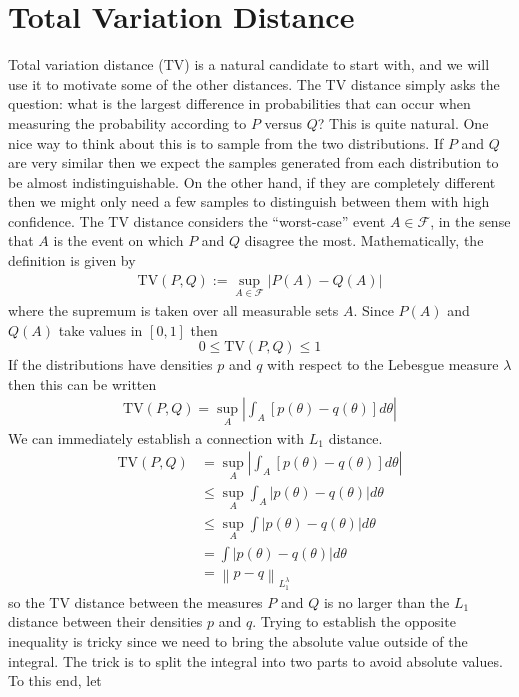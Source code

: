 \documentclass[12pt]{article}
\newcommand*{\norm}[1]{\left\lVert#1\right\rVert}
\newcommand*{\abs}[1]{\left\lvert#1\right\rvert}
\begin{document}
\section{Total Variation Distance}
Total variation distance (TV) is a natural candidate to start with, and we will use it to motivate some of the other distances. The TV distance simply asks the question: what is the largest difference in 
probabilities that can occur when measuring the probability according to $P$ versus $Q$? This is quite natural. One nice way to think about this is to sample from the 
two distributions. If $P$ and $Q$ are very similar then we expect the samples generated from each distribution to be almost indistinguishable. On the other hand, if they are completely 
different then we might only need a few samples to distinguish between them with high confidence. The TV distance considers the ``worst-case'' event $A \in \mathcal{F}$, in the sense that $A$ is the event 
on which $P$ and $Q$ disagree the most. Mathematically, the definition is given by 
\begin{align*}
\text{TV}(P, Q) := \sup_{A \in \mathcal{F}} \abs{P(A) - Q(A)}
\end{align*}
where the supremum is taken over all measurable sets $A$. Since $P(A)$ and $Q(A)$ take values in $[0, 1]$ then 
\[0 \leq \text{TV}(P, Q) \leq 1\]
If the distributions have densities $p$ and $q$ with respect to the Lebesgue measure $\lambda$ then this can be 
written 
\begin{align*}
\text{TV}(P, Q) = \sup_{A} \abs{\int_A \left[p(\theta) - q(\theta)\right] d\theta }
\end{align*}
We can immediately establish a connection with $L_1$ distance. 
\begin{align*}
\text{TV}(P, Q) &= \sup_{A} \abs{\int_A \left[p(\theta) - q(\theta)\right] d\theta } \\
				 &\leq \sup_{A} \int_A \abs{p(\theta) - q(\theta)} d\theta \\
				 &\leq \sup_{A} \int \abs{p(\theta) - q(\theta)} d\theta \\
				 &= \int \abs{p(\theta) - q(\theta)} d\theta \\
				 &= \norm{p - q}_{L_1^\lambda}
\end{align*}
so the TV distance between the measures $P$ and $Q$ is no larger than the $L_1$ distance between their densities $p$ and $q$. Trying to establish the opposite 
inequality is tricky since we need to bring the absolute value outside of the integral. The trick is to split the integral into two parts to avoid absolute values. To this end, let 
\end{document}
